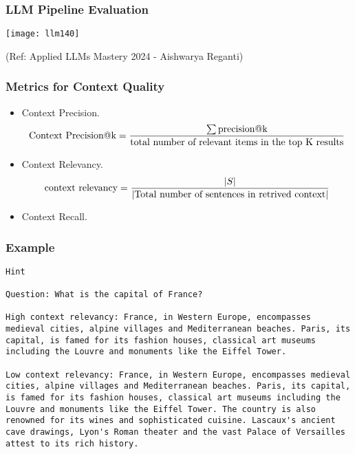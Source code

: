 \begin{frame}[fragile]\frametitle{LLM Pipeline Evaluation}

\begin{center}
\texttt{[image: llm140]}
\end{center}				

{\tiny (Ref: Applied LLMs Mastery 2024 - Aishwarya Reganti)}  
\end{frame}

\begin{frame}[fragile]\frametitle{Metrics for Context Quality}

\begin{itemize}
\item Context Precision.
$$\text{Context Precision@k} = {\sum {\text{precision@k}} \over \text{total number of relevant items in the top K results}}$$
\item Context Relevancy. $$\text{context relevancy} = {|S| \over |\text{Total number of sentences in retrived context}|}$$
\item Context Recall.
\end{itemize}

\end{frame}

\begin{frame}[fragile]\frametitle{Example}
  
\begin{lstlisting}
Hint

Question: What is the capital of France?

High context relevancy: France, in Western Europe, encompasses medieval cities, alpine villages and Mediterranean beaches. Paris, its capital, is famed for its fashion houses, classical art museums including the Louvre and monuments like the Eiffel Tower.

Low context relevancy: France, in Western Europe, encompasses medieval cities, alpine villages and Mediterranean beaches. Paris, its capital, is famed for its fashion houses, classical art museums including the Louvre and monuments like the Eiffel Tower. The country is also renowned for its wines and sophisticated cuisine. Lascaux's ancient cave drawings, Lyon's Roman theater and the vast Palace of Versailles attest to its rich history.

\end{lstlisting}  
			

\end{frame}

